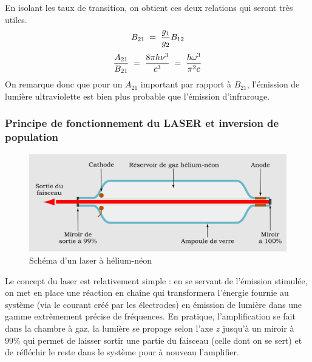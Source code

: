 En isolant les taux de transition, on obtient ces deux relations qui seront très utiles.
\begin{equation}
    B_{21} \; = \; \dfrac{g_1}{g_2}B_{12}
    \label{eq:equilire1}
\end{equation}
\begin{equation}
    \dfrac{A_{21}}{B_{21}}
    \; = \; \dfrac{8\pi h \nu^3}{c^3}
    \; = \; \dfrac{\hbar \omega^3}{\pi^2c}
    \label{eq:equilire2}
\end{equation}
On remarque donc que pour un $A_{21}$ important par rapport à $B_{21}$, l'émission de lumière ultraviolette est bien plus probable que l'émission d'infrarouge.


\subsubsection{Principe de fonctionnement du LASER et inversion de population}



\begin{figure}[htp]
    \centering
    \includegraphics[scale=0.7]{Images2/Laser.png}
    \caption{Schéma d'un laser à hélium-néon}
    \label{fig:Laser}
\end{figure}
Le concept du laser est relativement simple : en se servant de l'émission stimulée, on met en place une réaction en chaîne qui transformera l'énergie fournie au système (via le courant créé par les électrodes) en émission de lumière dans une gamme extrêmement précise de fréquences. En pratique, l'amplification se fait dans la chambre à gaz, la lumière se propage selon l'axe $z$ jusqu'à un miroir à 99\% qui permet de laisser sortir une partie du faisceau (celle dont on se sert) et de réfléchir le reste dans le système pour à nouveau l'amplifier.

